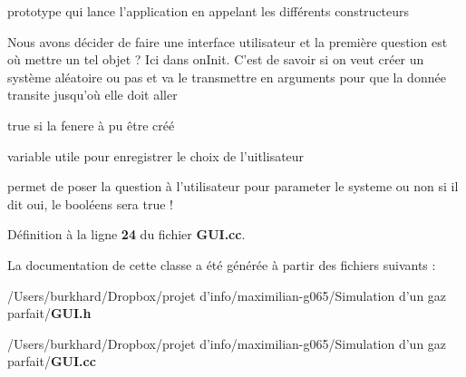 prototype qui lance l'application en appelant les différents constructeurs 

Nous avons décider de faire une interface utilisateur et la première question est où mettre un tel objet ? Ici dans on\+Init. C'est de savoir si on veut créer un système aléatoire ou pas et va le transmettre en arguments pour que la donnée transite jusqu'où elle doit aller \begin{DoxyVerb}\return true si la fenere à pu être créé\end{DoxyVerb}
 variable utile pour enregistrer le choix de l'uitlisateur

permet de poser la question à l'utilisateur pour parameter le systeme ou non si il dit oui, le booléens sera true ! 

Définition à la ligne {\bf 24} du fichier {\bf G\+U\+I.\+cc}.



La documentation de cette classe a été générée à partir des fichiers suivants \+:\begin{DoxyCompactItemize}
\item 
/\+Users/burkhard/\+Dropbox/projet d'info/maximilian-\/g065/\+Simulation d'un gaz parfait/{\bf G\+U\+I.\+h}\item 
/\+Users/burkhard/\+Dropbox/projet d'info/maximilian-\/g065/\+Simulation d'un gaz parfait/{\bf G\+U\+I.\+cc}\end{DoxyCompactItemize}
